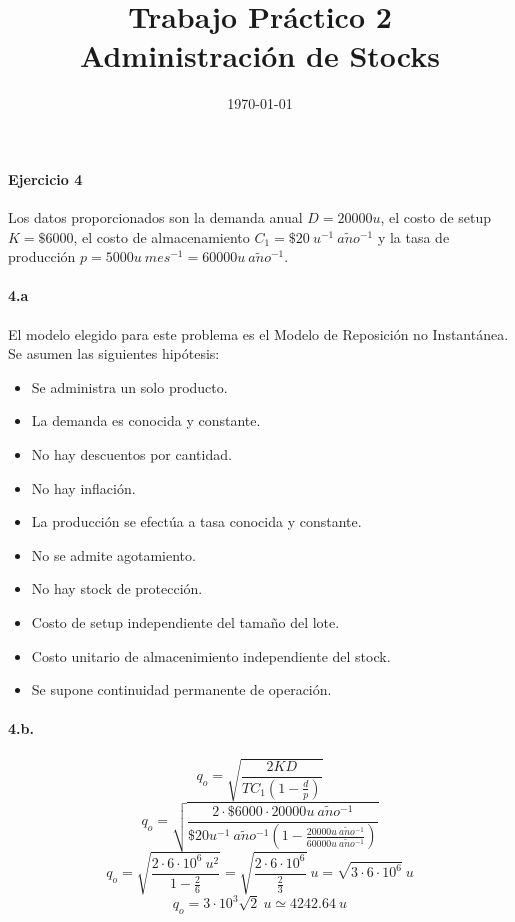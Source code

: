 \documentclass{article}
\title{Trabajo Práctico 2\\Administración de Stocks}
\author{}
\date{\today}
\def \anio {a\tilde{n}o}
\begin{document}
\maketitle

\paragraph{Ejercicio 4}
    Los datos proporcionados son la demanda anual $ D = 20000 u $, el costo de setup $ K = \$6000 $, el costo de almacenamiento $ C_1 = \$20\ u^{-1}\ \anio^{-1} $ y la tasa de producción $ p = 5000u\ mes^{-1} = 60000u\ \anio^{-1}$.

    \paragraph{4.a}
    El modelo elegido para este problema es el Modelo de Reposición no Instantánea. Se asumen las siguientes hipótesis:
        \begin{itemize}
            \item Se administra un solo producto.
            \item La demanda es conocida y constante.
            \item No hay descuentos por cantidad.
            \item No hay inflación.
            \item La producción se efectúa a tasa conocida y constante.
            \item No se admite agotamiento.
            \item No hay stock de protección.
            \item Costo de setup independiente del tamaño del lote.
            \item Costo unitario de almacenimiento independiente del stock.
            \item Se supone continuidad permanente de operación.
        \end{itemize}

    \paragraph{4.b.} 
        $$ q_o = \sqrt{ \frac{2KD}{TC_1 \left( 1 - \frac{d}{p} \right)} } $$
        $$ q_o = \sqrt{ \frac{2 \cdot \$ 6000 \cdot 20000u\ \anio^{-1}}{\$20 u^{-1}\ \anio^{-1} \left( 1 - \frac{20000u\ \anio^{-1}}{60000u\ \anio^{-1}} \right)} } $$
        $$ q_o = \sqrt{ \frac{2 \cdot 6 \cdot 10^6\ u^2}{1 - \frac{2}{6}} } = \sqrt{ \frac{2 \cdot 6 \cdot 10^6}{\frac{2}{3}} }\ u = \sqrt{ 3 \cdot 6 \cdot 10^6 }\ u $$
        $$ \boxed{ q_o = 3 \cdot 10^3 \sqrt {2}\ u \simeq 4242.64\ u } $$
\end{document}
